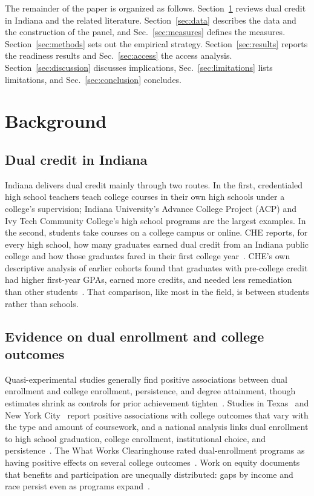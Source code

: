 \documentclass[aps,prd,reprint,superscriptaddress,nofootinbib,floatfix]{revtex4-2}
\begin{document}
The remainder of the paper is organized as follows. Section~\ref{sec:background} reviews dual credit in Indiana and the related literature. Section~\ref{sec:data} describes the data and the construction of the panel, and Sec.~\ref{sec:measures} defines the measures. Section~\ref{sec:methods} sets out the empirical strategy. Section~\ref{sec:results} reports the readiness results and Sec.~\ref{sec:access} the access analysis. Section~\ref{sec:discussion} discusses implications, Sec.~\ref{sec:limitations} lists limitations, and Sec.~\ref{sec:conclusion} concludes.

\section{Background}\label{sec:background}

\subsection{Dual credit in Indiana}

Indiana delivers dual credit mainly through two routes. In the first, credentialed high school teachers teach college courses in their own high schools under a college's supervision; Indiana University's Advance College Project (ACP) and Ivy Tech Community College's high school programs are the largest examples. In the second, students take courses on a college campus or online. CHE reports, for every high school, how many graduates earned dual credit from an Indiana public college and how those graduates fared in their first college year~\cite{chedata}. CHE's own descriptive analysis of earlier cohorts found that graduates with pre-college credit had higher first-year GPAs, earned more credits, and needed less remediation than other students~\cite{che2016}. That comparison, like most in the field, is between students rather than schools.

\subsection{Evidence on dual enrollment and college outcomes}

Quasi-experimental studies generally find positive associations between dual enrollment and college enrollment, persistence, and degree attainment, though estimates shrink as controls for prior achievement tighten~\cite{an2013,karp2007,speroni2011}. Studies in Texas~\cite{giani2014,miller2017} and New York City~\cite{allen2012} report positive associations with college outcomes that vary with the type and amount of coursework, and a national analysis links dual enrollment to high school graduation, college enrollment, institutional choice, and persistence~\cite{lee2022}. The What Works Clearinghouse rated dual-enrollment programs as having positive effects on several college outcomes~\cite{wwc2017}. Work on equity documents that benefits and participation are unequally distributed: gaps by income and race persist even as programs expand~\cite{taylor2015,fink2017}.
\end{document}

